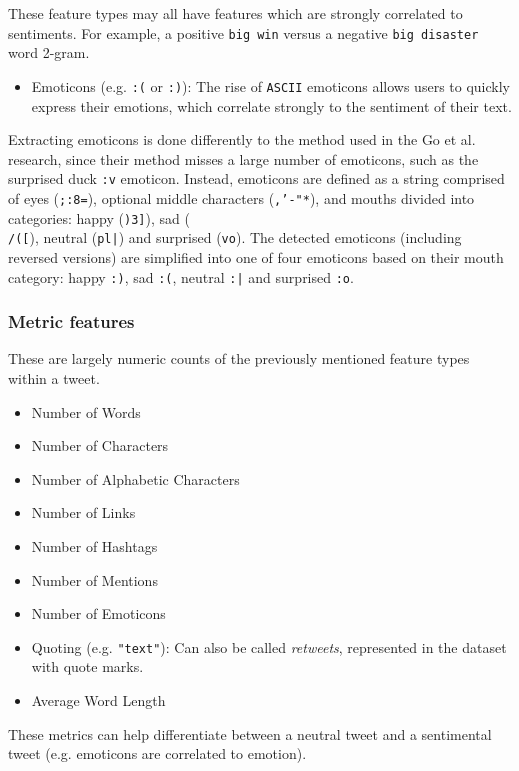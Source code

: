 \documentclass[11pt]{article}
\begin{document}
These feature types may all have features which are strongly correlated to sentiments.
For example, a positive \texttt{big win} versus a negative \texttt{big disaster} word 2-gram.

\begin{itemize}
	\item Emoticons (e.g. \texttt{:(} or \texttt{:)}): The rise of \texttt{ASCII} emoticons allows users to quickly express their emotions, which correlate strongly to the sentiment of their text.
\end{itemize}  

Extracting emoticons is done differently to the method used in the Go et al.  research,
since their method misses a large number of emoticons, such as the surprised duck \texttt{:v} emoticon.
Instead, emoticons are defined as a string comprised of eyes (\texttt{;:8=}), optional middle characters (\texttt{,'-"*}), 
and mouths divided into categories: happy (\texttt{)3]}), sad (\texttt{\\/([}), neutral (\texttt{pl|}) and surprised (\texttt{vo}).
The detected emoticons (including reversed versions) are simplified into one of four emoticons based on their mouth category: happy \texttt{:)}, sad \texttt{:(}, neutral \texttt{:|} and surprised \texttt{:o}.

\subsubsection{Metric features}

These are largely numeric counts of the previously mentioned feature types within a tweet.

\begin{itemize}
	\item Number of Words
	\item Number of Characters
	\item Number of Alphabetic Characters
	\item Number of Links
	\item Number of Hashtags
	\item Number of Mentions
	\item Number of Emoticons
	\item Quoting (e.g. \texttt {"text"}): Can also be called \emph{retweets}, represented in the dataset with quote marks.
	\item Average Word Length
\end{itemize}

These metrics can help differentiate between a neutral tweet and a sentimental tweet (e.g. emoticons are correlated to emotion).
\end{document}
